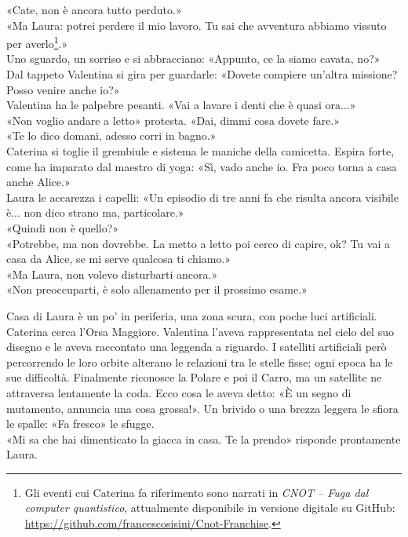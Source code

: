 \documentclass[10pt,oneside]{extbook}
\begin{document}
«Cate, non \`e ancora tutto perduto.»\\
«Ma Laura: potrei perdere il mio lavoro. Tu sai che avventura abbiamo vissuto per averlo\footnote{Gli eventi cui Caterina fa riferimento sono narrati in
\emph{CNOT -- Fuga dal computer quantistico}, attualmente disponibile
in versione digitale su GitHub: \url{https://github.com/francescosisini/Cnot-Franchise}.}.»\\
Uno sguardo, un sorriso e si abbracciano: «Appunto, ce la siamo cavata, no?»\\
Dal tappeto Valentina si gira per guardarle: «Dovete compiere un'altra missione? Posso venire anche io?»\\
Valentina ha le palpebre pesanti. «Vai a lavare i denti che \`e quasi ora...»\\
«Non voglio andare a letto» protesta. «Dai, dimmi cosa dovete fare.»\\
«Te lo dico domani, adesso corri in bagno.»\\
Caterina si toglie il grembiule e sistema le maniche della camicetta. Espira forte, come ha imparato dal maestro di yoga: «Sì, vado anche io. Fra poco torna a casa anche Alice.»\\
Laura le accarezza i capelli:  «Un episodio di tre anni fa che risulta ancora visibile \`e... non dico strano ma, particolare.»\\
«Quindi non \`e quello?»\\
«Potrebbe, ma non dovrebbe. La metto a letto poi cerco di capire, ok? Tu vai a casa da Alice, se mi serve qualcosa ti chiamo.»\\

«Ma Laura, non volevo disturbarti ancora.»\\
«Non preoccuparti, \`e solo allenamento per il prossimo esame.»\\


\par\medskip
Casa di Laura \`e un po' in periferia, una zona scura, con poche luci artificiali. Caterina  cerca l'Orsa Maggiore. Valentina l'aveva rappresentata nel cielo del suo disegno e le aveva  raccontato una leggenda a riguardo. I satelliti artificiali per\`o percorrendo le loro orbite alterano le relazioni tra le stelle fisse; ogni epoca ha le sue difficoltà. Finalmente riconosce la Polare e poi il Carro, ma un satellite ne attraversa lentamente la coda. Ecco cosa le aveva detto: «\`E un segno di mutamento,   annuncia una cosa grossa!». Un brivido o una brezza leggera le sfiora le spalle: «Fa fresco» le sfugge.\\
«Mi sa che hai dimenticato la giacca in casa. Te la prendo» risponde prontamente Laura.
\end{document}
